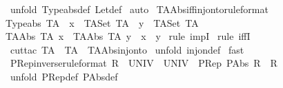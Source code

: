 \begin{isabellebody}
\isamarkupfalse%
\ {\isacharparenleft}unfold\ Typeabs{\isacharunderscore}def\ Let{\isacharunderscore}def{\isacharparenright}\isanewline
{}\isamarkupfalse%
\ auto\isanewline
{}\isamarkupfalse%
%
\endisatagproof
{\isafoldproof}%
%
\isadelimproof
\isanewline
%
\endisadelimproof
\isanewline
{}\isamarkupfalse%
\ TAAbs{\isacharunderscore}iff{\isacharunderscore}inj{\isacharunderscore}onto{\isacharbrackleft}rule{\isacharunderscore}format{\isacharbrackright}{\isacharcolon}\ \isanewline
{\isachardoublequoteopen}Typeabs\ TA\ {\isacharminus}{\isacharminus}{\isachargreater}\ x\ {\isacharcolon}\ TASet\ TA\ {\isacharminus}{\isacharminus}{\isachargreater}\ y\ {\isacharcolon}\ TASet\ TA\ {\isacharminus}{\isacharminus}{\isachargreater}\ \ \isanewline
{\isacharparenleft}{\isacharparenleft}TAAbs\ TA\ x{\isacharparenright}\ {\isacharequal}\ {\isacharparenleft}TAAbs\ TA\ y{\isacharparenright}{\isacharparenright}\ {\isacharequal}\ {\isacharparenleft}x\ {\isacharequal}\ y{\isacharparenright}{\isachardoublequoteclose}\isanewline
%
\isadelimproof
%
\endisadelimproof
%
\isatagproof
{}\isamarkupfalse%
\ {\isacharparenleft}rule\ impI{\isacharparenright}{\isacharplus}\isanewline
{}\isamarkupfalse%
\ {\isacharparenleft}rule\ iffI{\isacharparenright}\isanewline
{}\isamarkupfalse%
\ {\isacharparenleft}cut{\isacharunderscore}tac\ TA\ {\isacharequal}\ {\isachardoublequoteopen}TA{\isachardoublequoteclose}\ \ TAAbs{\isacharunderscore}inj{\isacharunderscore}onto{\isacharparenright}\isanewline
{}\isamarkupfalse%
\ {\isacharparenleft}unfold\ inj{\isacharunderscore}on{\isacharunderscore}def{\isacharparenright}\isanewline
{}\isamarkupfalse%
\ fast{\isacharplus}\isanewline
{}\isamarkupfalse%
%
\endisatagproof
{\isafoldproof}%
%
\isadelimproof
\isanewline
%
\endisadelimproof
\isanewline
{}\isamarkupfalse%
\ PRep{\isacharunderscore}inverse{\isacharbrackleft}rule{\isacharunderscore}format{\isacharbrackright}{\isacharcolon}\ {\isachardoublequoteopen}R\ {\isacharcolon}\ {\isacharparenleft}UNIV\ {\isacharminus}{\isacharminus}{\isacharminus}{\isachargreater}\ UNIV{\isacharparenright}\ {\isacharminus}{\isacharminus}{\isachargreater}\ {\isacharparenleft}{\isacharparenleft}PRep\ {\isacharparenleft}PAbs\ R{\isacharparenright}{\isacharparenright}\ {\isacharequal}\ R{\isacharparenright}{\isachardoublequoteclose}\isanewline
%
\isadelimproof
%
\endisadelimproof
%
\isatagproof
{}\isamarkupfalse%
\ {\isacharparenleft}unfold\ PRep{\isacharunderscore}def\ PAbs{\isacharunderscore}def{\isacharparenright}\isanewline

\end{isabellebody}
